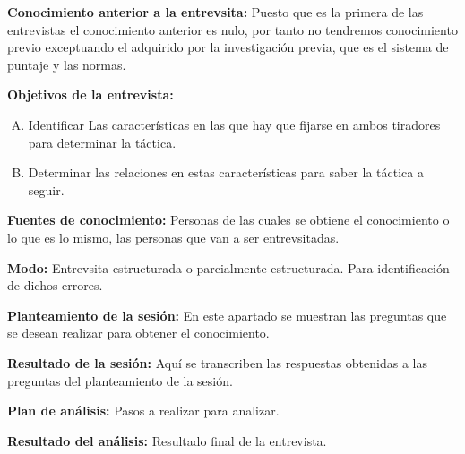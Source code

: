 \textbf{Conocimiento anterior a la entrevsita:} Puesto que es la primera de las entrevistas el conocimiento anterior es nulo, por tanto no
tendremos conocimiento previo exceptuando el adquirido por la investigación previa, que es el
sistema de puntaje y las normas.

\textbf{Objetivos de la entrevista:}
  \begin{enumerate}[(A)]
    \item Identificar Las características en las que hay que fijarse
     en ambos tiradores para determinar la táctica.
    \item Determinar las relaciones en estas características para saber la táctica a seguir.
  \end{enumerate}

\textbf{Fuentes de conocimiento:} Personas de las cuales se obtiene el conocimiento o
 lo que es lo mismo, las personas que van a ser entrevsitadas.

\textbf{Modo:} Entrevsita estructurada o parcialmente estructurada. Para identificación de
 dichos errores.

\textbf{Planteamiento de la sesión:} En este apartado se muestran las preguntas que se desean
 realizar para obtener el conocimiento.

\textbf{Resultado de la sesión:} Aquí se transcriben las respuestas obtenidas a las preguntas
 del planteamiento de la sesión.

\textbf{Plan de análisis:} Pasos a realizar para analizar.

\textbf{Resultado del análisis:} Resultado final de la entrevista.


